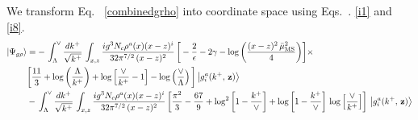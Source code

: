 \documentclass[10pt]{article}
\numberwithin{equation}{section}
\begin{document}
 We transform Eq.~ \eqref{combinedgrho} into coordinate space using Eqs.~. \eqref{i1} and \eqref{i8}.
 \begin{align}\label{grhoposition}
     \left|\Psi_{g\rho}\right\rangle & = -\,\int_{\Lambda}^{\vee}\frac{dk^{+}}{\sqrt{k^{+}}}\,\int_{x,z} \frac{ig^{3}N_{c}\rho^{a}(x)(x-z)^{i}}{32\pi^{7/2}\,(x-z)^{2}}\,\bigg[-\frac{2}{\epsilon}-2\gamma -\log{\left(\frac{(x-z)^{2}\,\Bar{\mu}_{\mathrm{MS}}^{2}}{4}\right)}\bigg]\times\notag \\ & \bigg[\frac{11}{3}+ \log{\left(\frac{\Lambda}{k^{+}}\right)}+\log{\left[\frac{\vee}{k^{+}}-1\right]}-\log\left(\frac{\vee}{\Lambda}\right)\bigg]\left|g_{i}^{a}(k^{+},\, \mathbf{z})\right\rangle \notag \\ & -\,\int_{\Lambda}^{\vee}\frac{dk^{+}}{\sqrt{k^{+}}}\,\int_{x,z} \frac{ig^{3}N_{c}\rho^{a}(x)(x-z)^{i}}{32\pi^{7/2}\,(x-z)^{2}}\,\bigg[\frac{\pi^{2}}{3} - \frac{67}{9} + \log^{2}{\left[1-\frac{k^{+}}{\vee}\right]}+\log{\left[1-\frac{k^{+}}{\vee}\right]}\,\log{\left[\frac{\vee}{k^{+}}\right]}\bigg]\, \left|g_{i}^{a}(k^{+},\, \mathbf{z})\right\rangle
\end{align}
\end{document}
